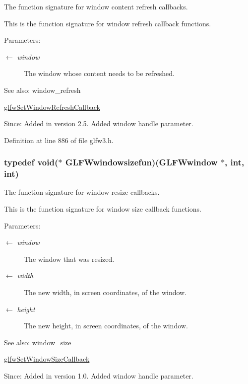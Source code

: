 The function signature for window content refresh callbacks. 

This is the function signature for window refresh callback functions.

\begin{Desc}
\item[Parameters:]
\begin{description}
\item[\mbox{$\leftarrow$} {\em window}]The window whose content needs to be refreshed.\end{description}
\end{Desc}
\begin{Desc}
\item[See also:]window\_\-refresh 

\hyperlink{group__window_g9d2621fbc271a0cdc0ce91f9749f46e3}{glfwSetWindowRefreshCallback}\end{Desc}
\begin{Desc}
\item[Since:]Added in version 2.5.  Added window handle parameter. \end{Desc}


Definition at line 886 of file glfw3.h.\hypertarget{group__window_gaca1c2715759d03da9834eac19323d4a}{
\subsubsection[GLFWwindowsizefun]{\setlength{\rightskip}{0pt plus 5cm}typedef void($\ast$  {\bf GLFWwindowsizefun})({\bf GLFWwindow} $\ast$, int, int)}}
\label{group__window_gaca1c2715759d03da9834eac19323d4a}


The function signature for window resize callbacks. 

This is the function signature for window size callback functions.

\begin{Desc}
\item[Parameters:]
\begin{description}
\item[\mbox{$\leftarrow$} {\em window}]The window that was resized. \item[\mbox{$\leftarrow$} {\em width}]The new width, in screen coordinates, of the window. \item[\mbox{$\leftarrow$} {\em height}]The new height, in screen coordinates, of the window.\end{description}
\end{Desc}
\begin{Desc}
\item[See also:]window\_\-size 

\hyperlink{group__window_g150dad5f364425916c5816074cffa5e7}{glfwSetWindowSizeCallback}\end{Desc}
\begin{Desc}
\item[Since:]Added in version 1.0.  Added window handle parameter. \end{Desc}


